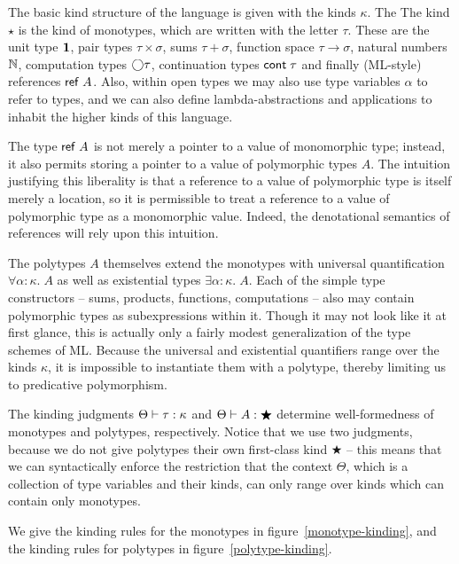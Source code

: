 The basic kind structure of the language is given with the kinds
$\kappa$. The The kind $\star$ is the kind of monotypes, which are
written with the letter $\tau$. These are the unit type $\mathbf{1}$,
pair types $\tau \times \sigma$, sums $\tau + \sigma$, function space
$\tau \to \sigma$, natural numbers $\mathbb{N}$, computation types
$\bigcirc{\tau}$, continuation types $\mathsf{cont}\;{\tau}$ and finally
(ML-style) references $\mathsf{ref}\;A$. Also, within open types we may
also use type variables $\alpha$ to refer to types, and we can also
define lambda-abstractions and applications to inhabit the higher
kinds of this language.

The type $\mathsf{ref}\;A$ is not merely a pointer to a value of
monomorphic type; instead, it also permits storing a pointer to a
value of polymorphic types $A$. The intuition justifying this
liberality is that a reference to a value of polymorphic type is
itself merely a location, so it is permissible to treat a reference to
a value of polymorphic type as a monomorphic value. Indeed, the
denotational semantics of references will rely upon this intuition.

The polytypes $A$ themselves extend the monotypes with universal
quantification $\forall \alpha:\kappa.\;A$ as well as existential
types $\exists \alpha:\kappa.\;A$. Each of the simple type
constructors -- sums, products, functions, computations -- also may
contain polymorphic types as subexpressions within it. Though it may
not look like it at first glance, this is actually only a fairly
modest generalization of the type schemes of ML. Because the universal
and existential quantifiers range over the kinds $\kappa$, it is
impossible to instantiate them with a polytype, thereby limiting us to
predicative polymorphism.

The kinding judgments ${\Theta} \vdash {\tau} : {\kappa}$ and
${\Theta} \vdash {A} : {\bigstar}$ determine well-formedness of monotypes and
polytypes, respectively. Notice that we use two judgments, because we
do not give polytypes their own first-class kind $\bigstar$ -- this
means that we can syntactically enforce the restriction that the
context $\Theta$, which is a collection of type variables and their
kinds, can only range over kinds which can contain only monotypes.

We give the kinding rules for the monotypes in
figure~\ref{monotype-kinding}, and the kinding rules for polytypes
in figure~\ref{polytype-kinding}. 

